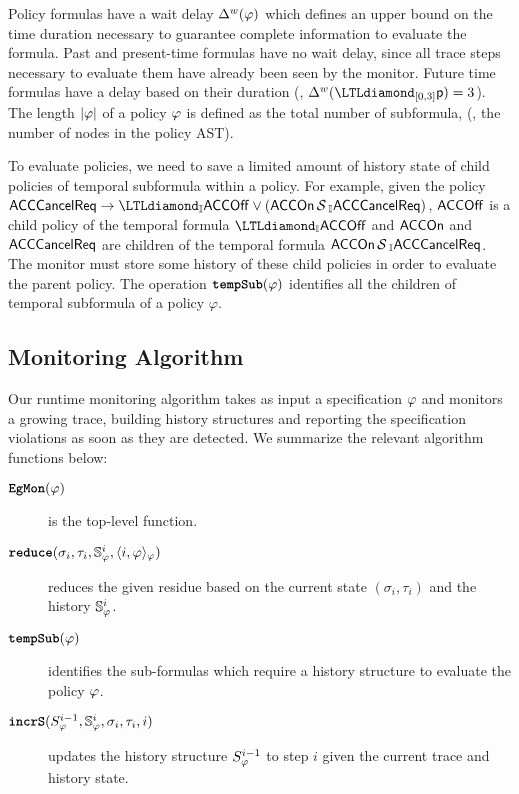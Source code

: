 Policy formulas have a wait delay $\Delta^w(\varphi)$ which defines an upper bound on the time duration necessary to guarantee complete information to evaluate the formula. Past and present-time formulas have no wait delay, since all trace steps necessary to evaluate them have already been seen by the monitor. Future time formulas have a delay based on their duration (\eg, $\wdelay(\LTLdiamond_{[0,3]} \pred{p}) = 3$). The length $|\varphi|$ of a policy $\varphi$ is defined as the total number of subformula, (\ie, the number of nodes in the policy AST).

To evaluate \planguage policies, we need to save a limited amount of history state of child policies of temporal subformula within a policy. 
For example, given the policy $\pred{ACCCancelReq} \rightarrow \eventually_{\interval} \pred{ACCOff} \vee (\pred{ACCOn} \since_{\interval} \pred{ACCCancelReq})$, $\mathsf{ACCOff}$ is a child policy of the temporal formula $\eventually_{\interval} \pred{ACCOff}$ and $\mathsf{ACCOn}$ and $\mathsf{ACCCancelReq}$ are children of the temporal formula $\mathsf{ACCOn} \,\mathrm{\cal S}\,_{\mathbb{I}} \mathsf{ACCCancelReq}$. 
The monitor must store some history of these child policies in order to evaluate the parent policy.
The operation $\textbf{\texttt{tempSub}}(\varphi)$ identifies all the children of temporal subformula of a policy $\varphi$.




\subsection{Monitoring Algorithm}
Our runtime monitoring algorithm \monitor takes as input a specification $\varphi$ and monitors a growing trace, building history structures and reporting the specification violations as soon as they are detected. We summarize the relevant algorithm functions below:

\begin{description}
\item[$\textbf{\texttt{EgMon}}{}(\varphi)$] is the top-level function. 
\item[$\textbf{\texttt{reduce}}(\sigma_i, \tau_i, \mathbb{S}^{i}_{\varphi}, \langle i, \varphi \rangle_{\varphi})$] reduces the given residue based on the current state $(\sigma_i,\tau_i)$ and the history $\mathbb{S}^{i}_{\varphi}$.
\item[$\textbf{\texttt{tempSub}}(\varphi)$] identifies the sub-formulas which require a history structure to evaluate the policy $\varphi$.
\item[$\textbf{\texttt{incrS}}({S}^{i-1}_{\varphi}, \mathbb{S}^{i}_{\varphi}, \sigma_i, \tau_i, i)$] updates the history structure ${S}^{i-1}_{\varphi}$ to step $i$ given the current trace and history state.
\end{description}




